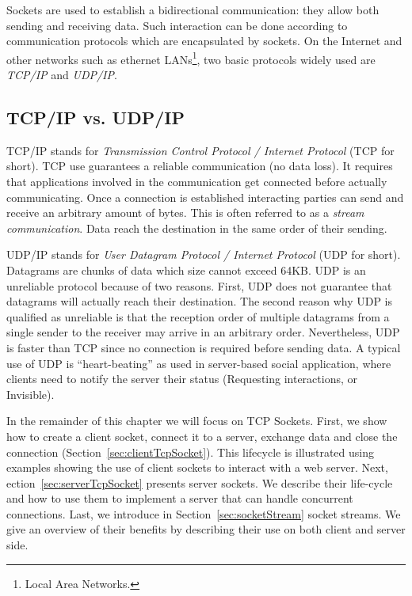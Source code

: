 \documentclass[a4paper,10pt,twoside]{book}
\begin{document}
Sockets are used to establish a bidirectional communication: they allow both sending and receiving data. 
Such interaction can be done according to communication protocols which are encapsulated by sockets. On the Internet and other networks such as ethernet LANs\footnote{Local Area Networks.}, two basic protocols widely used are \textit{TCP/IP} and \textit{UDP/IP}.

\subsection{TCP/IP vs. UDP/IP}
TCP/IP stands for \textit{Transmission Control Protocol / Internet Protocol} (TCP for short).
TCP use guarantees a reliable communication (no data loss). It requires that applications involved in the communication get connected before actually communicating. 
Once a connection is established interacting parties can send and receive an arbitrary amount of bytes. This is often referred to as a \textit{stream communication}.
Data reach the destination in the same order of their sending.

UDP/IP stands for \textit{User Datagram Protocol / Internet Protocol} (UDP for short).
Datagrams are chunks of data which size cannot exceed 64KB. UDP is an unreliable protocol because of two reasons. First, UDP does not guarantee that  datagrams will actually reach their destination.
The second reason why UDP is qualified as unreliable is that the reception order of multiple datagrams from a single sender to the receiver may arrive in an arbitrary order.
Nevertheless, UDP is faster than TCP since no connection is required before sending data.
A typical use of UDP is  ``heart-beating'' as used in server-based social application, where clients need to notify the server their status (\eg Requesting interactions, or Invisible).

In the remainder of this chapter we will focus on TCP Sockets.
First, we show how to create a client socket, connect it to a server, exchange data and close the connection (Section~\ref{sec:clientTcpSocket}).
This lifecycle is illustrated using examples showing the use of client sockets to interact with a web server. 
Next, ection~\ref{sec:serverTcpSocket} presents server sockets.
We describe their life-cycle and how to use them to implement a server that can handle concurrent connections.
Last, we introduce in Section~\ref{sec:socketStream} socket streams.
We give an overview of their benefits by describing their use on both client and server side.
 
\end{document}
